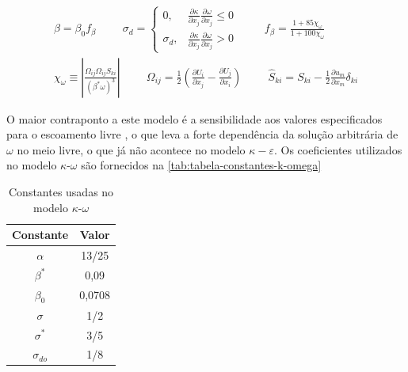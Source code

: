 \begin{equation}
\begin{aligned}
	\beta = \beta_{0}f_{\beta} 
	\hspace{1cm}
	\sigma_{d} =
	\begin{cases}
		0, &	\frac{\partial\kappa}{\partial x_j	}\frac{\partial \omega}{\partial x_j} \leq 0 \\
		\sigma_d, & \frac{\partial\kappa}{\partial x_j	}\frac{\partial \omega}{\partial x_j} > 0
	\end{cases}
	\hspace{1cm}
	f_{\beta} = \frac{1 + 85\chi_{\omega}}{1 + 100\chi_{\omega}} \\
	\chi_{\omega} \equiv \left|\frac{\Omega_{ij}\Omega_{ij}\hat{S}_{ki}}{(\beta^{*}\omega)^3}\right|
	\hspace{1cm}
	\Omega_{ij} = \frac{1}{2}\left(\frac{\partial U_i}{\partial x_j} - \frac{\partial U_j}{\partial x_i}\right)
	\hspace{1cm}
	\hat{S}_{ki} = S_{ki} - \frac{1}{2}\frac{\partial u_m}{\partial x_m}\delta_{ki}
\end{aligned}
\end{equation}

O maior contraponto a este modelo é a sensibilidade aos valores especificados para o escoamento livre \cite{Menter1992}, o que leva a forte dependência da solução arbitrária de $\omega$ no meio livre, o que já não acontece no modelo $\kappa-\varepsilon$. Os coeficientes utilizados no modelo $\kappa$-$\omega$ são fornecidos na \autoref{tab:tabela-constantes-k-omega}

\begin{table}[ht]
\centering
\caption[Constantes usadas no modelo $\kappa$-$\omega$ \cite{Wilcox1988ReassessmentOT,Wilcox2006,Wilcox2008}]{Constantes usadas no modelo $\kappa$-$\omega$ \cite{Wilcox1988ReassessmentOT,Wilcox2006,Wilcox2008}}
\vspace{0.5cm}
\begin{tabular}{c|c}
 
Constante & Valor \\
\hline
$\alpha$ & 13/25 \\
$\beta^*$ & 0,09 \\
$\beta_{0}$ & 0,0708 \\
$\sigma$ & 1/2 \\
$\sigma^*$ & 3/5 \\
$\sigma_{do}$ & 1/8

\end{tabular}
\label{tab:tabela-constantes-k-omega}
\end{table}

